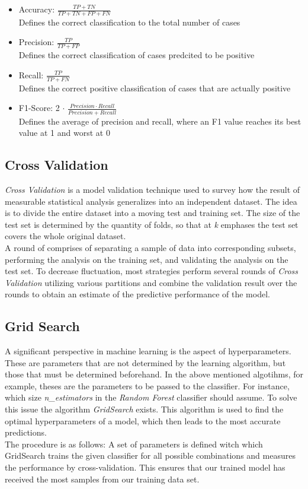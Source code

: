 \documentclass[a4paper, 11pt,titlepage,oneside,openany]{book}
\begin{document}
\begin{itemize}
	\item Accuracy: $\frac{TP+TN}{TP+TN+FP+FN}$\\
					Defines the correct classification to the total number of cases
	\item Precision: $\frac{TP}{TP+FP}$\\
	Defines the correct classification of cases predcited to be positive
	\item Recall: $\frac{TP}{TP+FN}$\\
	Defines the correct positive classification of cases that are actually positive
	\item F1-Score: 2 $\cdot$ $\frac{Precision \cdot Recall}{Precision+Recall}$\\
	Defines the average of precision and recall,
	where an F1 value reaches its best value at 1
	and worst at 0
\end{itemize}

\subsection{Cross Validation}
\textit{Cross Validation} is a model validation technique used to survey how the result of measurable statistical analysis generalizes into an independent dataset. The idea is to divide the entire dataset into a moving test and training set. The size of the test set is determined by the quantity of folds, so that at \textit{k} emphases the test set covers the whole original dataset.\\
\noindent A round of  comprises of separating a sample of data into corresponding subsets, performing the analysis on the training set, and validating the analysis on the test set. To decrease fluctuation, most strategies perform several rounds of \textit{Cross Validation} utilizing various partitions and combine the validation result over the rounds to obtain an estimate of the predictive performance of the model.

\subsection{Grid Search}
A significant perspective in machine learning is the aspect of hyperparameters. These are parameters that are not determined by the learning algorithm, but those that must be determined beforehand. In the above mentioned algotihms, for example, theses are the parameters to be passed to the classifier. For instance, which size \textit{n\_estimators} in the \textit{Random Forest} classifier should assume. To solve this issue the algorithm \textit{GridSearch} exists. This algorithm is used to find the optimal hyperparameters of a model, which then leads to the most accurate predictions. \\
\noindent The procedure is as follows: A set of parameters is defined witch which GridSearch trains the given classifier for all possible combinations and measures the performance by cross-validation. This ensures that our trained model has received the most samples from our training data set. 
\end{document}
